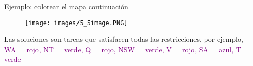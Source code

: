 \begin{frame}{Ejemplo: colorear el mapa continuación}
\begin{figure}
    \centering
    \texttt{[image: images/5\_5image.PNG]}
\end{figure}
Las soluciones son tareas que satisfacen todas las restricciones, por ejemplo,\\
\scriptsize\textcolor{Purple}{ \left\lbrace WA = rojo, NT = verde, Q = rojo, NSW = verde, V = rojo, SA = azul, T = verde\right\rbrace}\
\end{frame}